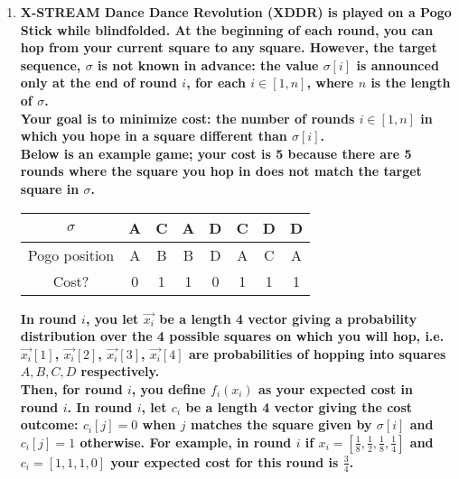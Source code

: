 \documentclass{article}
\begin{document}
\begin{enumerate}
\begin{enumerate}


\end{enumerate}







\newpage
\item \textbf{X-STREAM Dance Dance Revolution (XDDR) is played on a Pogo Stick while blindfolded. At the beginning of each round, you can hop from your current square to any square. However, the target sequence, $\sigma$ is not known in advance: the value $\sigma[i]$ is announced only at the end of round $i$, for each $i \in [1,n]$, where $n$ is the length of $\sigma$. } \\
\textbf{Your goal is to minimize cost: the number of rounds $i \in [1,n]$ in which you hope in a square different than $\sigma[i]$. } \\
\textbf{Below is an example game; your cost is 5 because there are 5 rounds where the square you hop in does not match the target square in $\sigma$. } 

\begin{table}[h!]
    \centering
    \begin{tabular}{|c|ccccccc|} \hline
        $\sigma$ & A & C & A & D & C & D & D \\ \hline
        Pogo position & A & B & B & D & A & C & A \\ \hline
        Cost? & 0 & 1 & 1 & 0 & 1 & 1 & 1 \\ \hline
    \end{tabular}
\end{table}

\textbf{In round $i$, you let $\overrightarrow{x_i}$ be a length 4 vector giving a probability distribution over the 4 possible squares on which you will hop, i.e. $\overrightarrow{x_i}[1]$, $\overrightarrow{x_i}[2]$, $\overrightarrow{x_i}[3]$, $\overrightarrow{x_i}[4]$ are probabilities of hopping into squares $A,B,C,D$ respectively. } \\
\textbf{Then, for round $i$, you define $f_i(x_i)$ as your expected cost in round $i$. In round $i$, let $c_i$ be a length 4 vector giving the cost outcome: $c_i[j] = 0$ when $j$ matches the square given by $\sigma[i]$ and $c_i[j] = 1$ otherwise. For example, in round $i$ if $x_i = [\frac{1}{8}, \frac{1}{2}, \frac{1}{8}, \frac{1}{4}]$ and $c_i = [1,1,1,0]$ your expected cost for this round is $\frac{3}{4}$. }


\end{enumerate}
\end{document}
